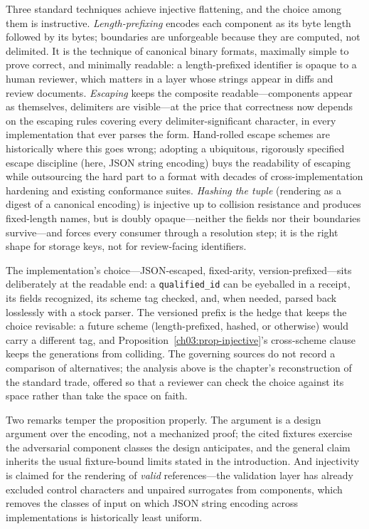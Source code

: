 Three standard techniques achieve injective flattening, and the
choice among them is instructive. \emph{Length-prefixing} encodes
each component as its byte length followed by its bytes; boundaries
are unforgeable because they are computed, not delimited. It is the
technique of canonical binary formats, maximally simple to prove
correct, and minimally readable: a length-prefixed identifier is
opaque to a human reviewer, which matters in a layer whose strings
appear in diffs and review documents. \emph{Escaping} keeps the
composite readable---components appear as themselves, delimiters
are visible---at the price that correctness now depends on the
escaping rules covering every delimiter-significant character, in
every implementation that ever parses the form. Hand-rolled escape
schemes are historically where this goes wrong; adopting a
ubiquitous, rigorously specified escape discipline (here, JSON
string encoding) buys the readability of escaping while
outsourcing the hard part to a format with decades of
cross-implementation hardening and existing conformance suites.
\emph{Hashing the tuple} (rendering as a digest of a canonical
encoding) is injective up to collision resistance and produces
fixed-length names, but is doubly opaque---neither the fields nor
their boundaries survive---and forces every consumer through a
resolution step; it is the right shape for storage keys, not for
review-facing identifiers.

The implementation's choice---JSON-escaped, fixed-arity,
version-prefixed---sits deliberately at the readable end: a
\texttt{qualified\_id} can be eyeballed in a receipt, its fields
recognized, its scheme tag checked, and, when needed, parsed back
losslessly with a stock parser. The versioned prefix is the hedge
that keeps the choice revisable: a future scheme (length-prefixed,
hashed, or otherwise) would carry a different tag, and
Proposition~\ref{ch03:prop-injective}'s cross-scheme clause keeps
the generations from colliding. The governing sources do not
record a comparison of alternatives; the analysis above is the
chapter's reconstruction of the standard trade, offered so that a
reviewer can check the choice against its space rather than take
the space on faith.

Two remarks temper the proposition properly. The argument is a
design argument over the encoding, not a mechanized proof; the
cited fixtures exercise the adversarial component classes the
design anticipates, and the general claim inherits the usual
fixture-bound limits stated in the introduction. And injectivity
is claimed for the rendering of \emph{valid} references---the
validation layer has already excluded control characters and
unpaired surrogates from components, which removes the classes of
input on which JSON string encoding across implementations is
historically least uniform.

